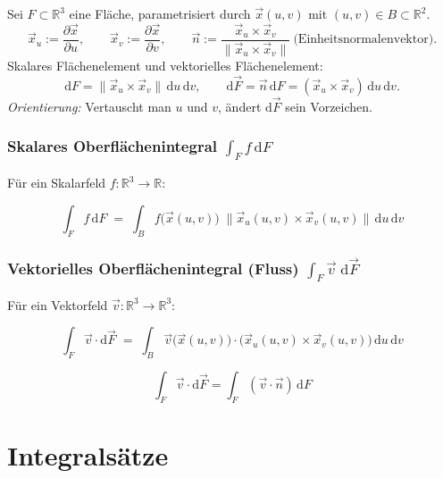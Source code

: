 \documentclass[a4paper,11pt,oneside,open=any,parskip=half, DIV=15]{scrreprt}
\begin{document}
   Sei \(F\subset\mathbb{R}^3\) eine Fläche, parametrisiert durch \(\vec{x}(u,v)\) mit \((u,v)\in B\subset\mathbb{R}^2\).
   \[
      \vec{x}_u:=\frac{\partial\vec{x}}{\partial u},\qquad
      \vec{x}_v:=\frac{\partial\vec{x}}{\partial v},\qquad
      \vec{n}:=\frac{\vec{x}_u\times\vec{x}_v}{\|\vec{x}_u\times\vec{x}_v\|}\ \text{(Einheitsnormalenvektor)}.
   \]
   Skalares Flächenelement und vektorielles Flächenelement:
   \[
      \mathrm{d}F=\|\vec{x}_u\times\vec{x}_v\|\,\mathrm{d}u\,\mathrm{d}v,\qquad
      \mathrm{d}\vec{F}=\vec{n}\,\mathrm{d}F=(\vec{x}_u\times\vec{x}_v)\,\mathrm{d}u\,\mathrm{d}v.
   \]
   \emph{Orientierung:} Vertauscht man \(u\) und \(v\), ändert \(\mathrm{d}\vec{F}\) sein Vorzeichen.

   \subsection*{Skalares Oberflächenintegral \(\displaystyle \int_{F} f\,\mathrm{d}F\)}
      Für ein Skalarfeld \(f:\mathbb{R}^3\to\mathbb{R}\):
      \begin{importantbox}
         \[
            \ \int_{F} f\,\mathrm{d}F\;=\;\int_{B} f\big(\vec{x}(u,v)\big)\;\|\vec{x}_u(u,v)\times\vec{x}_v(u,v)\|\,\mathrm{d}u\,\mathrm{d}v\
         \]
      \end{importantbox}
   
   \subsection*{Vektorielles Oberflächenintegral (Fluss) \(\displaystyle \int_{F}\vec{v} \; \mathrm{d}\vec{F}\)}
      Für ein Vektorfeld \(\vec{v}:\mathbb{R}^3\to\mathbb{R}^3\):
      \begin{importantbox} 
         \[
            \ \int_{F}\vec{v}\cdot \mathrm{d}\vec{F}\;=\;\int_{B}\vec{v}\big(\vec{x}(u,v)\big)\cdot\big(\vec{x}_u(u,v)\times\vec{x}_v(u,v)\big)\,\mathrm{d}u\,\mathrm{d}v\
         \]
      \end{importantbox}
      \begin{importantbox}
         \[ 
            \int_{F}\vec{v}\cdot \mathrm{d}\vec{F}=\int_{F}(\vec{v}\cdot\vec{n})\,\mathrm{d}F
         \]
      \end{importantbox}

\chapter{Integralsätze}
\end{document}

